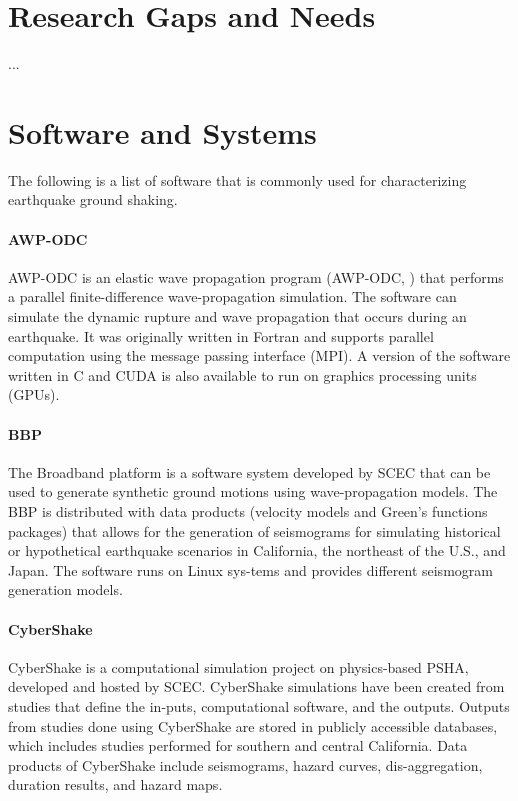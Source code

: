 \section{Research Gaps and Needs}
\label{sec:eq_shake_gaps}

...

\section{Software and Systems}
\label{sec:eq_shake_tools}

The following is a list of software that is commonly used for characterizing earthquake ground shaking.

\paragraph{AWP-ODC} AWP-ODC is an elastic wave propagation program (AWP-ODC, \cite{cui2010scalable}) that performs a parallel finite-difference wave-propagation simulation. The software can simulate the dynamic rupture and wave propagation that occurs during an earthquake. It was originally written in Fortran and supports parallel computation using the message passing interface (MPI). A version of the software written in C and CUDA is also available to run on graphics processing units (GPUs).

\paragraph{BBP} The Broadband platform \citep{maechling2015scec} is a software system developed by SCEC that can be used to generate synthetic ground motions using wave-propagation models. The BBP is distributed with data products (velocity models and Green’s functions packages) that allows for the generation of seismograms for simulating historical or hypothetical earthquake scenarios in California, the northeast of the U.S., and Japan. The software runs on Linux sys-tems and provides different seismogram generation models.

\paragraph{CyberShake} CyberShake is a computational simulation project on physics-based PSHA, developed and hosted by SCEC. CyberShake simulations have been created from studies that define the in-puts, computational software, and the outputs. Outputs from studies done using CyberShake are stored in publicly accessible databases, which includes studies performed for southern and central California. Data products of CyberShake include seismograms, hazard curves, dis-aggregation, duration results, and hazard maps.

